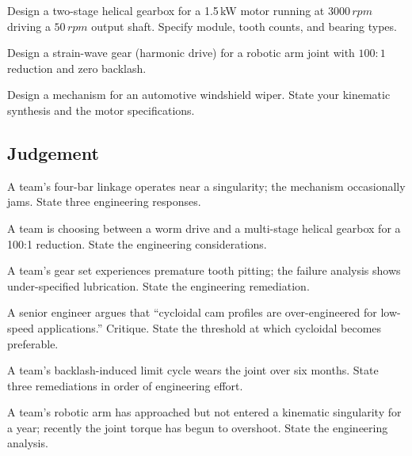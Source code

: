 \begin{exercise}
Design a two-stage helical gearbox for a 1.5\,\si{\kilo\watt} motor running at $3000\,\si{rpm}$ driving a $50\,\si{rpm}$ output shaft. Specify module, tooth counts, and bearing types.
\end{exercise}

\begin{exercise}
Design a strain-wave gear (harmonic drive) for a robotic arm joint with $100:1$ reduction and zero backlash.
\end{exercise}

\begin{exercise}
Design a mechanism for an automotive windshield wiper. State your kinematic synthesis and the motor specifications.
\end{exercise}

\subsection*{Judgement}

\begin{exercise}
A team's four-bar linkage operates near a singularity; the mechanism occasionally jams. State three engineering responses.
\end{exercise}

\begin{exercise}
A team is choosing between a worm drive and a multi-stage helical gearbox for a 100:1 reduction. State the engineering considerations.
\end{exercise}

\begin{exercise}
A team's gear set experiences premature tooth pitting; the failure analysis shows under-specified lubrication. State the engineering remediation.
\end{exercise}

\begin{exercise}
A senior engineer argues that ``cycloidal cam profiles are over-engineered for low-speed applications.'' Critique. State the threshold at which cycloidal becomes preferable.
\end{exercise}

\begin{exercise}
A team's backlash-induced limit cycle wears the joint over six months. State three remediations in order of engineering effort.
\end{exercise}

\begin{exercise}
A team's robotic arm has approached but not entered a kinematic singularity for a year; recently the joint torque has begun to overshoot. State the engineering analysis.
\end{exercise}

